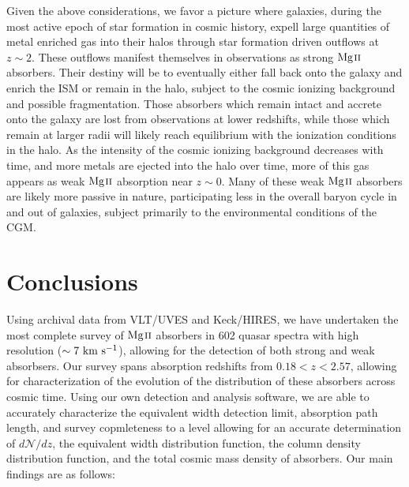 \documentclass[iop,apj,numberedappendix,appendixfloats,twocolappendix]{emulateapj}
\begin{document}
Given the above considerations, we favor a picture where galaxies, during the most active epoch of star formation in cosmic history, expell large quantities of metal enriched gas into their halos through star formation driven outflows at $z \sim 2$. These outflows manifest themselves in observations as strong ${\hbox{{\rm Mg}\kern 0.1em{\sc ii}}}$ absorbers. Their destiny will be to eventually either fall back onto the galaxy and enrich the ISM or remain in the halo, subject to the cosmic ionizing background and possible fragmentation. Those absorbers which remain intact and accrete onto the galaxy are lost from observations at lower redshifts, while those which remain at larger radii will likely reach equilibrium with the ionization conditions in the halo. As the intensity of the cosmic ionizing background decreases with time, and more metals are ejected into the halo over time, more of this gas appears as weak ${\hbox{{\rm Mg}\kern 0.1em{\sc ii}}}$ absorption near $z \sim 0$. Many of these weak ${\hbox{{\rm Mg}\kern 0.1em{\sc ii}}}$ absorbers are likely more passive in nature, participating less in the overall baryon cycle in and out of galaxies, subject primarily to the environmental conditions of the CGM.

\section{Conclusions}
\label{sec:conclusions}

Using archival data from VLT/UVES and Keck/HIRES, we have undertaken the most complete survey of ${\hbox{{\rm Mg}\kern 0.1em{\sc ii}}}$ absorbers in 602 quasar spectra with high resolution ($\sim 7~\mathrm{\hbox{km~s$^{-1}$}}$), allowing for the detection of both strong and weak {\MgII} absorbsers. Our survey spans absorption redshifts from $0.18 < z < 2.57$, allowing for characterization of the evolution of the distribution of these absorbers across cosmic time. Using our own detection and analysis software, we are able to accurately characterize the equivalent width detection limit, absorption path length, and survey copmleteness to a level allowing for an accurate determination of $d\mathcal{N}\!/dz$, the equivalent width distribution function, the column density distribution function, and the total cosmic mass density of {\MgII} absorbers. Our main findings are as follows:
\end{document}
